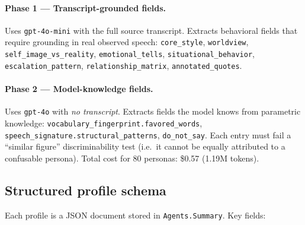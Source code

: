 \documentclass[12pt,a4paper]{article}
\begin{document}
\paragraph{Phase 1 --- Transcript-grounded fields.}
Uses \texttt{gpt-4o-mini} with the full source transcript. Extracts behavioral fields
that require grounding in real observed speech: \texttt{core\_style}, \texttt{worldview},
\texttt{self\_image\_vs\_reality}, \texttt{emotional\_tells}, \texttt{situational\_behavior},
\texttt{escalation\_pattern}, \texttt{relationship\_matrix}, \texttt{annotated\_quotes}.

\paragraph{Phase 2 --- Model-knowledge fields.}
Uses \texttt{gpt-4o} with \emph{no transcript}. Extracts fields the model knows from
parametric knowledge: \texttt{vocabulary\_fingerprint.favored\_words},
\texttt{speech\_signature.structural\_patterns}, \texttt{do\_not\_say}. Each entry must
fail a ``similar figure'' discriminability test (i.e.\ it cannot be equally attributed to
a confusable persona). Total cost for 80 personas: \$0.57 (1.19M tokens).

\subsection{Structured profile schema}

Each profile is a JSON document stored in \texttt{Agents.Summary}. Key fields:
\end{document}
